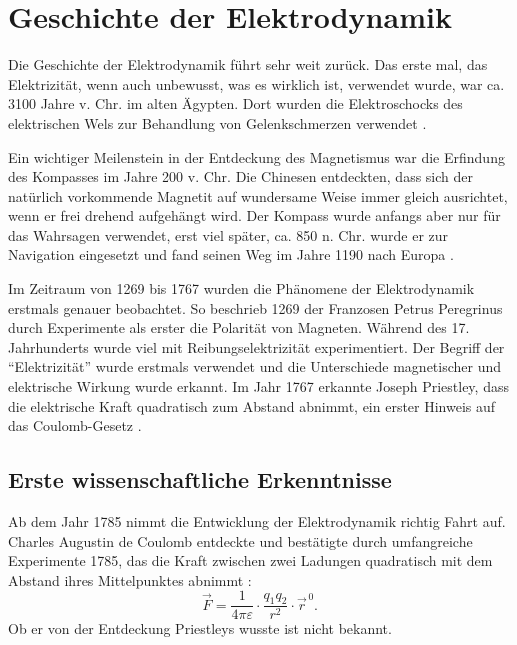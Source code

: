 %
%
%
\section{Geschichte der Elektrodynamik\label{maxwell:section:teil0}}

Die Geschichte der Elektrodynamik führt sehr weit zurück.
Das erste mal, das Elektrizität, wenn auch unbewusst, was es wirklich ist, verwendet wurde, war ca. 3100 Jahre v. Chr. im alten Ägypten.
Dort wurden die Elektroschocks des elektrischen Wels zur Behandlung von Gelenkschmerzen verwendet \cite{maxwell:History_of_bioelectricity}.

Ein wichtiger Meilenstein in der Entdeckung des Magnetismus war die Erfindung des Kompasses im Jahre 200 v. Chr.
Die Chinesen entdeckten, dass sich der natürlich vorkommende Magnetit auf wundersame Weise immer gleich ausrichtet, wenn er frei drehend aufgehängt wird.
Der Kompass wurde anfangs aber nur für das Wahrsagen verwendet, erst viel später, ca. 850 n. Chr. wurde er zur Navigation eingesetzt und fand seinen Weg im Jahre 1190 nach Europa \cite{maxwell:History_of_the_compass}.

Im Zeitraum von 1269 bis 1767 wurden die Phänomene der Elektrodynamik erstmals genauer beobachtet.
So beschrieb 1269 der Franzosen Petrus Peregrinus durch Experimente als erster die Polarität von Magneten.
Während des 17. Jahrhunderts wurde viel mit Reibungselektrizität experimentiert. Der Begriff der ``Elektrizität'' wurde erstmals verwendet und die Unterschiede magnetischer und elektrische Wirkung wurde erkannt.
Im Jahr 1767 erkannte Joseph Priestley, dass die elektrische Kraft quadratisch zum Abstand abnimmt, ein erster Hinweis auf das Coulomb-Gesetz \cite{maxwell:History_of_electromagnetic_theory}.

\subsection{Erste wissenschaftliche Erkenntnisse}
Ab dem Jahr 1785 nimmt die Entwicklung der Elektrodynamik richtig Fahrt auf.
Charles Augustin de Coulomb entdeckte und bestätigte durch umfangreiche Experimente 1785, das die Kraft zwischen zwei Ladungen quadratisch mit dem Abstand ihres Mittelpunktes abnimmt \cite{maxwell:Charles-Augustin_de_Coulomb}:
\[
\vec{F}
=
\frac{1}{4 \pi \varepsilon}
\cdot
\frac{q_1 q_2}{r^2}
\cdot
\vec{r}^{\,0}.
\]
Ob er von der Entdeckung Priestleys wusste ist nicht bekannt.

